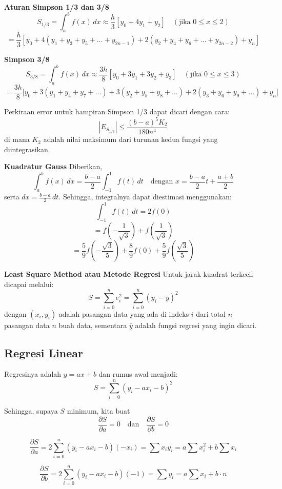 \documentclass[a4paper,extrafontsizes, 9pt]{memoir}
\begin{document}
\begin{multicols}{3}
\textbf{Aturan Simpson 1/3 dan 3/8}
\[
S_{1/3} = \int_a^b f(x) \, dx \approx \frac{h}{3} \left[y_0 + 4y_1 + y_2 \right] \quad (\text{jika } 0 \leq x \leq 2)
\]
\[
= \frac{h}{3} \left[y_0 + 4(y_1 + y_3 + y_5 + \dots + y_{2n-1}) + 2(y_2 + y_4 + y_6 + \dots + y_{2n-2}) + y_n\right]
\]

\textbf{Simpson 3/8}
\[
S_{3/8} = \int_a^b f(x) \, dx \approx \frac{3h}{8} \left[y_0 + 3y_1 + 3y_2 + y_3\right] \quad (\text{jika } 0 \leq x \leq 3)
\]
\[
= \frac{3h}{8} \Big[y_0 + 3(y_1 + y_4 + y_7 + \dots) + 3(y_2 + y_5 + y_8 + \dots) + 2(y_3 + y_6 + y_9 + \dots) + y_n\Big]
\]

Perkiraan error untuk hampiran Simpson 1/3 dapat dicari dengan cara:
\[
\left|E_{S_{1/3}}\right| \leq \frac{(b-a)^5 K_2}{180n^4}
\]
di mana $K_2$ adalah nilai maksimum dari turunan kedua fungsi yang diintegrasikan.

\textbf{Kuadratur Gauss}
Diberikan,
\[
\int_a^b f(x) \, dx = \frac{b-a}{2} \int_{-1}^1 f(t) \, dt \quad \text{dengan } x = \frac{b-a}{2}t + \frac{a+b}{2}
\]
serta $dx = \frac{b-a}{2} \, dt$. Sehingga, integralnya dapat diestimasi menggunakan:
\[
\int_{-1}^1 f(t) \, dt = 2f(0) \tag{1}
\]
\[
= f\left(-\frac{1}{\sqrt{3}}\right) + f\left(\frac{1}{\sqrt{3}}\right) \tag{2}
\]
\[
= \frac{5}{9} f\left(-\frac{\sqrt{3}}{5}\right) + \frac{8}{9} f(0) + \frac{5}{9} f\left(\frac{\sqrt{3}}{5}\right) \tag{3}
\]

\textbf{Least Square Method atau Metode Regresi}
Untuk jarak kuadrat terkecil dicapai melalui:
\[
S = \sum_{i=0}^n e_i^2 = \sum_{i=0}^n (y_i - \bar{y})^2
\]
dengan $(x_i, y_i)$ adalah pasangan data yang ada di indeks $i$ dari total $n$ pasangan data $n$ buah data, sementara $\bar{y}$ adalah fungsi regresi yang ingin dicari.

\subsection*{\small Regresi Linear}
Regresinya adalah $y = ax + b$ dan rumus awal menjadi:
\[
S = \sum_{i=0}^n (y_i - ax_i - b)^2
\]

Sehingga, supaya $S$ minimum, kita buat
\[
\frac{\partial S}{\partial a} = 0 \quad \text{dan} \quad \frac{\partial S}{\partial b} = 0
\]

\[
\frac{\partial S}{\partial a} = 2 \sum_{i=0}^n (y_i - ax_i - b)(-x_i) = \sum x_i y_i = a \sum x_i^2 + b \sum x_i
\]

\[
\frac{\partial S}{\partial b} = 2 \sum_{i=0}^n (y_i - ax_i - b)(-1) = \sum y_i = a \sum x_i + b \cdot n
\]


\end{multicols}
\end{document}

